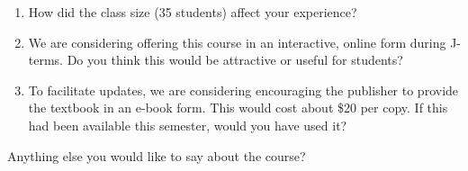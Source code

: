 \documentclass{article}
\newcommand{\answerSpace}{\vspace*{1.5cm}}
\begin{document}
\begin{enumerate}
\bigskip

\item How did the class size (35 students) affect your experience?

\answerSpace

\item We are considering offering this course in an interactive, online form during J-terms.  Do you think this would be 
attractive or useful for students?

\answerSpace

\item To facilitate updates, we are considering encouraging the publisher to provide the textbook in an e-book form.  This would cost about 
\$20 per copy.  If this had been available this semester, would you have used it?

\answerSpace

\end{enumerate}

Anything else you would like to say about the course?
\end{document}
